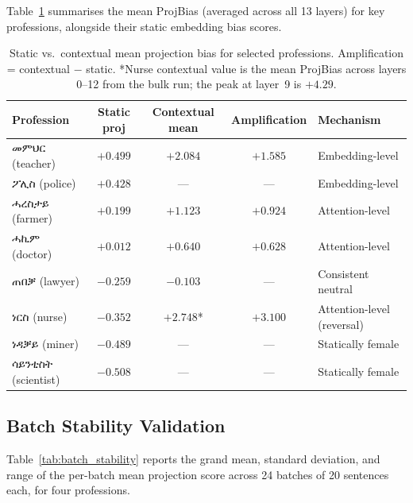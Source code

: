 Table~\ref{tab:prof_bias} summarises the mean ProjBias (averaged across all 13
layers) for key professions, alongside their static embedding bias scores.

\begin{table}[h]
\centering
\small
\begin{tabular}{lcccl}
\toprule
\textbf{Profession} & \textbf{Static proj} & \textbf{Contextual mean} & \textbf{Amplification} & \textbf{Mechanism} \\
\midrule
መምህር  (teacher)  & $+0.499$ & $+2.084$ & $+1.585$ & Embedding-level \\
ፖሊስ   (police)   & $+0.428$ & ---      & ---       & Embedding-level \\
ሓረስታይ (farmer)  & $+0.199$ & $+1.123$ & $+0.924$ & Attention-level \\
ሓኪም   (doctor)  & $+0.012$ & $+0.640$ & $+0.628$ & Attention-level \\
ጠበቓ   (lawyer)  & $-0.259$ & $-0.103$ & ---       & Consistent neutral \\
ነርስ    (nurse)   & $-0.352$ & $+2.748$* & $+3.100$ & Attention-level (reversal) \\
ነዳቓይ  (miner)   & $-0.489$ & ---       & ---       & Statically female \\
ሳይንቲስት (scientist) & $-0.508$ & ---     & ---       & Statically female \\
\bottomrule
\end{tabular}
\caption{Static vs.\ contextual mean projection bias for selected professions.
Amplification = contextual $-$ static. *Nurse contextual value is the mean
ProjBias across layers 0--12 from the bulk run; the peak at layer~9 is
$+4.29$.}
\label{tab:prof_bias}
\end{table}

\subsection{Batch Stability Validation}

Table~\ref{tab:batch_stability} reports the grand mean, standard deviation,
and range of the per-batch mean projection score across 24 batches of
20 sentences each, for four professions.

